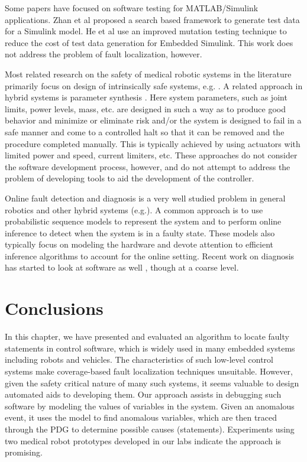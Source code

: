 Some papers have focused on software testing for MATLAB/Simulink applications. Zhan et al \cite{zhan2008search} proposed a search based framework to generate test data for a Simulink model. He et al \cite{he2011test} use an improved mutation testing technique to reduce the cost of test data generation for Embedded Simulink. This work does not address the problem of fault localization, however.

Most related research on the safety of medical robotic systems in the literature primarily focus on design of intrinsically safe systems, e.g. \cite{taylor2008medical,taylor1996computer,dombre2001intrinsically,duchemin2004medically}. A related approach in hybrid systems is parameter synthesis \cite{donze2009parameter}. Here system parameters, such as joint limits, power levels, mass, etc. are designed in such a way as to produce good behavior and minimize or eliminate risk and/or the system is designed to fail in a safe manner and come to a controlled halt so that it can be removed and the procedure completed manually. This is typically achieved by using actuators with limited power and speed, current limiters, etc. These approaches do not consider the software development process, however, and do not attempt to address the problem of developing tools to aid the development of the controller.

Online fault detection and diagnosis is a very well studied problem in general robotics and other hybrid systems (e.g.\cite{halder2007robust,mcintyre2005fault,verma2004real}). A common approach is to use probabilistic sequence models to represent the system and to perform online inference to detect when the system is in a faulty state. These models also typically focus on modeling the hardware and devote attention to efficient inference algorithms to account for the online setting. Recent work on diagnosis has started to look at software as well \cite{mikaelian2005model}, though at a coarse level.

\section{Conclusions}
In this chapter, we have presented and evaluated an algorithm to locate faulty statements in control software, which is widely used in many embedded systems including robots and vehicles. The characteristics of such low-level control systems make coverage-based fault localization techniques unsuitable. However, given the safety critical nature of many such systems, it seems valuable to design automated aids to developing them. Our approach assists in debugging such software by modeling the values of variables in the system. Given an anomalous event, it uses the model to find anomalous variables, which are then traced through the PDG to determine possible causes (statements). Experiments using two medical robot prototypes developed in our labs indicate the approach is promising.